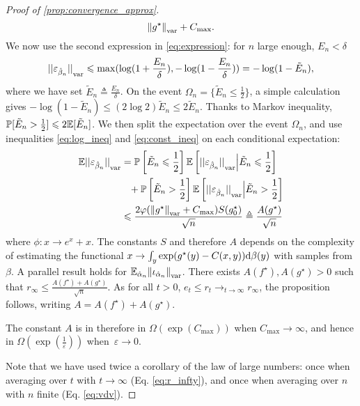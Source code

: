 \begin{proof}[Proof of \autoref{prop:convergence_approx}]
\begin{equation}
    {\Vert g^\star \Vert}_{\text{\upshape var}} + C_{\max}.
\end{equation}
 We now use the second expression in \eqref{eq:expression}: for $n$ large enough, $E_n < \delta$
\begin{equation}\label{eq:log_ineq}
    {|| \varepsilon_{\hat \beta_n} ||}_{\text{\upshape var}} \leqslant \max ( \log(1 + \frac{E_n}{\delta}),
     - \log(1 - \frac{E_n}{\delta}) ) = 
    - \log(1 - \tilde E_n),
\end{equation}
where we have set $\tilde E_n \triangleq \frac{E_n}{\delta}$. On the event
$\Omega_n = \{\tilde E_n \leq \frac{1}{2}\}$, a simple calculation gives $- \log(1
- \tilde E_n) \leq (2 \log 2) \tilde E_n \leq 2 \tilde E_n$. Thanks to Markov inequality,
$\mathbb{P}[\tilde E_n > \frac{1}{2}] \leqslant 2 \mathbb{E}[\tilde E_n]$. We then split the
expectation over the event $\Omega_n$, and use inequalities \eqref{eq:log_ineq}
and \eqref{eq:const_ineq} on each conditional expectation:
\begin{align}\label{eq:vdv}
    \mathbb{E} {|| \varepsilon_{\hat \beta_n} ||}_{\text{\upshape var}}  &= \mathbb{P}\left[\tilde E_n \leqslant \frac{1}{2}\right] 
    \mathbb{E} \left[ {|| \varepsilon_{\hat \beta_n} ||}_{\text{\upshape var}}
    \Big| \tilde E_n \leqslant \frac{1}{2}\right] 
    \\
    &\phantom{=}
    + \mathbb{P}\left[\tilde E_n > \frac{1}{2}\right]      \mathbb{E} \left[ {|| \varepsilon_{\hat \beta_n} ||}_{\text{\upshape var}}
    \Big| \tilde E_n > \frac{1}{2}\right] \\
    &\leqslant \frac{2 \varphi({\Vert g^\star \Vert}_{\text{\upshape var}} + C_{\max}) 
    S(g^\star_0)}{\sqrt{n}} \triangleq \frac{A(g^\star)}{\sqrt{n}}
\end{align}
where $\phi: x \to e^x +x$. The constants $S$ and therefore $A$ depends on the complexity of estimating
the functional $x \to \int_y \exp(g^\star(y) - C(x,y)) \textrm{d} \beta(y)$ with samples from $\beta$.
A parallel
result holds for $\mathbb{E}_{\hat \alpha_n} {\Vert \iota_{\hat \alpha_n}
\Vert}_{\text{\upshape var}}$. There exists $A(f^\star), A(g^\star) > 0$ such that $r_\infty \leq
\frac{A(f^\star) + A(g^\star)}{\sqrt{n}}$. As for all $t >0$, $e_t \leq r_t \to_{t \to \infty}
r_\infty$, the proposition follows,  writing $A = A(f^\star) + A(g^\star)$.

The constant $A$ is in therefore in $\Omega(\exp(C_{\max}))$ when $C_{\max} \to
\infty$, and hence in $\Omega(\exp(\frac{1}{\varepsilon}))$ when~$\varepsilon
\to 0$.

Note that we have used twice a corollary of the law of large numbers: once when
averaging over $t$ with $t \to \infty$ (Eq. \eqref{eq:r_infty}), and once when
averaging over $n$ with $n$ finite (Eq. \eqref{eq:vdv}).
\end{proof}

